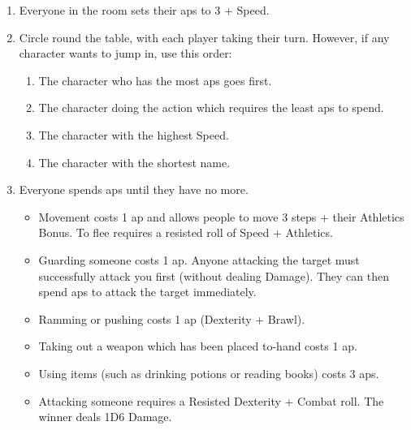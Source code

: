 \begin{enumerate}
  \item
  Everyone in the room sets their \glspl{ap} to 3 + Speed.
  \item
  Circle round the table, with each player taking their turn.
  However, if any character wants to jump in, use this order:
  \begin{enumerate}
    \item
    The character who has the most \glspl{ap} goes first.
    \item
    The character doing the action which requires the least \glspl{ap} to spend.
    \item
    The character with the highest Speed.
    \item
    The character with the shortest name.
  \end{enumerate}
  \item
  Everyone spends \glspl{ap} until they have no more.
  \begin{itemize}
    \item
    Movement costs 1 \gls{ap} and allows people to move 3 steps + their Athletics Bonus.
    To flee requires a resisted roll of Speed + Athletics.
    \item
    Guarding someone costs 1 \gls{ap}.
    Anyone attacking the target must successfully attack you first (without dealing Damage).
    They can then spend \glspl{ap} to attack the target immediately.
    \item
    Ramming or pushing costs 1 \gls{ap} (Dexterity + Brawl).
    \item
    Taking out a weapon which has been placed to-hand costs 1 \gls{ap}.
    \item
    Using items (such as drinking potions or reading books) costs 3 \glspl{ap}.
    \item
    Attacking someone requires a Resisted Dexterity + Combat roll.
    The winner deals 1D6 Damage.
  \end{itemize}
\end{enumerate}

